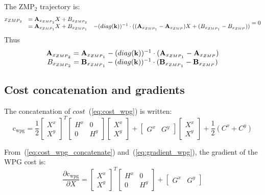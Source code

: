 \documentclass[journal]{IEEEtran}
\begin{document}
The ZMP$_2$ trajectory is:
\begin{equation}
\label{eq:zmp2_def}
\begin{matrix}
x_{\mbox{\tiny ZMP}_2} &=\mathbf{A}_{x_{\mbox{\tiny ZMP}_2}} X + B_{x_{\mbox{\tiny ZMP}_2}} \\
&=\mathbf{A}_{x_{\mbox{\tiny ZMP}_1}} X + B_{x_{\mbox{\tiny ZMP}_1}} &- (\mbox{diag}(\mathbf{k}))^{-1}\cdot((\mathbf{A}_{x_{\mbox{\tiny ZMP}_1}}-\mathbf{A}_{x_{\mbox{\tiny ZMP}}}) X + (B_{x_{\mbox{\tiny ZMP}_1}}-B_{x_{\mbox{\tiny ZMP}}}))
\end{matrix}=0
\end{equation}
Thus
\begin{equation}
\begin{matrix}
\mathbf{A}_{x_{\mbox{\tiny ZMP}_2}}=\mathbf{A}_{x_{\mbox{\tiny ZMP}_1}}-(\mbox{diag}(\mathbf{k}))^{-1}\cdot(\mathbf{A}_{x_{\mbox{\tiny ZMP}_1}}-\mathbf{A}_{x_{\mbox{\tiny ZMP}}}) \\
B_{x_{\mbox{\tiny ZMP}_2}}=\mathbf{B}_{x_{\mbox{\tiny ZMP}_1}}-(\mbox{diag}(\mathbf{k}))^{-1}\cdot(\mathbf{B}_{x_{\mbox{\tiny ZMP}_1}}-\mathbf{B}_{x_{\mbox{\tiny ZMP}}})
\end{matrix}
\end{equation}

\subsection{Cost concatenation and gradients}
The concatenation of $cost$~(\ref{eq:cost_wpg}) is written:
\begin{equation}
\label{eq:cost_wpg_concatenate}
\mbox{c}_{\text{wpg}}=\dfrac{1}{2}
\begin{bmatrix}
X^x \\ X^y
\end{bmatrix}^{T}
\begin{bmatrix}
H^x & 0\\ 0 & H^y
\end{bmatrix}\begin{bmatrix}
X^x \\ X^y
\end{bmatrix}+
\begin{bmatrix}
G^x & G^y
\end{bmatrix}
\begin{bmatrix}
X^x \\ X^y
\end{bmatrix}+
\dfrac{1}{2}(C^x+C^y)
\end{equation}

From~(\ref{eq:cost_wpg_concatenate}) and~(\ref{eq:gradient_wpg}), the gradient of the WPG cost is:
\begin{equation}
\dfrac{\partial{\mbox{c}_{\text{wpg}}}}{\partial{X}}=
\begin{bmatrix}
X^x \\ X^y
\end{bmatrix}^{T}
\begin{bmatrix}
H^x & 0\\ 0 & H^y
\end{bmatrix}+
\begin{bmatrix}
G^x & G^y
\end{bmatrix}
\end{equation}
\end{document}
